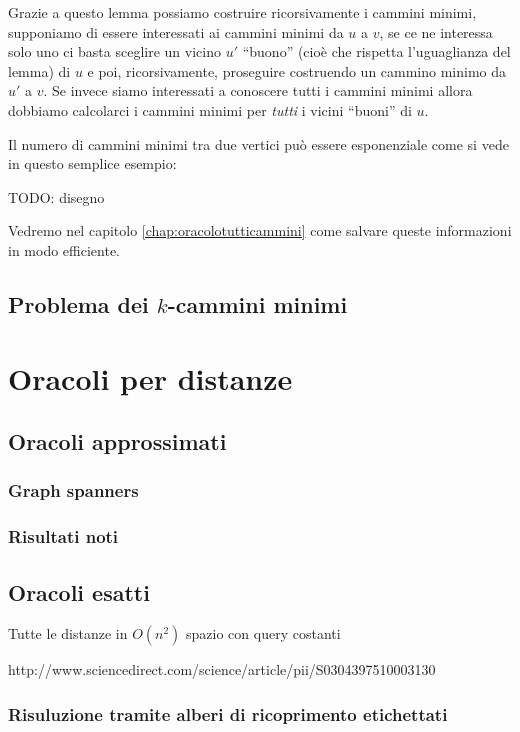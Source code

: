 \documentclass[a4paper,10pt]{amsbook}
\theoremstyle{plain}
\theoremstyle{definition}
\theoremstyle{remark}
\begin{document}
Grazie a questo lemma possiamo costruire ricorsivamente i cammini
minimi, supponiamo di essere interessati ai cammini minimi da $u$ a
$v$, se ce ne interessa solo uno ci basta sceglire un vicino $u'$
``buono'' (cioè che rispetta l'uguaglianza del lemma) di $u$ e poi,
ricorsivamente, proseguire costruendo un cammino minimo da $u'$ a
$v$. Se invece siamo interessati a conoscere tutti i cammini minimi
allora dobbiamo calcolarci i cammini minimi per \emph{tutti} i vicini
``buoni'' di $u$.

Il numero di cammini minimi tra due vertici può essere esponenziale
come si vede in questo semplice esempio:

TODO: disegno

Vedremo nel capitolo \ref{chap:oracolotutticammini} come salvare
queste informazioni in modo efficiente.

\section{Problema dei $k$-cammini minimi}


\chapter{Oracoli per distanze}

\section{Oracoli approssimati}

\subsection{Graph spanners}

\subsection{Risultati noti}

\section{Oracoli esatti}

Tutte le distanze in $O(n^2)$ spazio con query costanti

http://www.sciencedirect.com/science/article/pii/S0304397510003130

\subsection{Risuluzione tramite alberi di ricoprimento etichettati}
\end{document}
